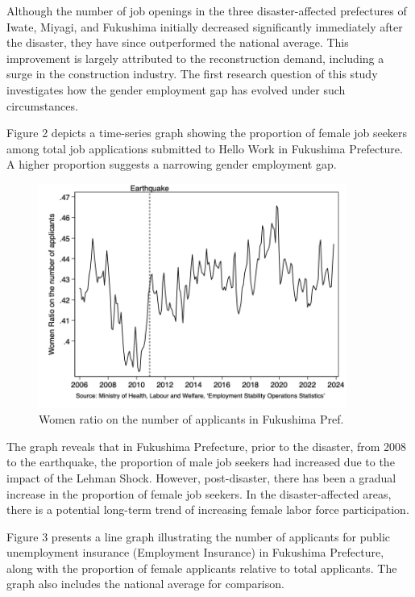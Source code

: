 \documentclass[12pt,halfline,a4paper]{ouparticle}
\begin{document}
Although the number of job openings in the three disaster-affected prefectures of Iwate, Miyagi, and Fukushima initially decreased significantly immediately after the disaster, they have since outperformed the national average. This improvement is largely attributed to the reconstruction demand, including a surge in the construction industry. The first research question of this study investigates how the gender employment gap has evolved under such circumstances.

Figure 2 depicts a time-series graph showing the proportion of female job seekers among total job applications submitted to Hello Work in Fukushima Prefecture. A higher proportion suggests a narrowing gender employment gap. 

\begin{figure}[h!]
    \centering
    \includegraphics[width=0.9\textwidth]{Women ratio on the number of applicants in Fukushima.png}  %
    \caption{Women ratio on the number of applicants in Fukushima Pref.}
    \label{fig:women_ratio_fukushima}
\end{figure}

The graph reveals that in Fukushima Prefecture, prior to the disaster, from 2008 to the earthquake, the proportion of male job seekers had increased due to the impact of the Lehman Shock. However, post-disaster, there has been a gradual increase in the proportion of female job seekers. In the disaster-affected areas, there is a potential long-term trend of increasing female labor force participation.

\newpage

Figure 3 presents a line graph illustrating the number of applicants for public unemployment insurance (Employment Insurance) in Fukushima Prefecture, along with the proportion of female applicants relative to total applicants. The graph also includes the national average for comparison. 
\end{document}
